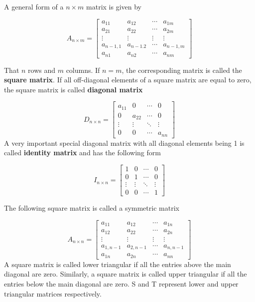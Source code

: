 \documentclass[
]{book}
\begin{document}
A general form of a \(n\times m\) matrix is given by

\[
A_{n\times m} = \left[\begin{array}{ccccc} 
a_{11} & a_{12} & \cdots & a_{1m}  \\ 
a_{21} & a_{22} & \cdots & a_{2m}  \\ 
\vdots & \vdots & \vdots & \vdots  \\
a_{n-1,1} & a_{n-1.2} & \cdots & a_{n-1,m}  \\
a_{n1} & a_{n2} & \cdots & a_{nm}  
\end{array}
\right]
\]

That \(n\) rows and \(m\) columns. If \(n = m\), the corresponding matrix is called the \textbf{square matrix}. If all off-diagonal elements of a square matrix are equal to zero, the square matrix is called \textbf{diagonal matrix}

\[
D_{n\times n} = \left[\begin{array}{ccccc} 
a_{11} & 0 & \cdots & 0  \\ 
0 & a_{22} & \cdots & 0  \\ 
\vdots & \vdots & \ddots & \vdots  \\
0 & 0& \cdots & a_{nn}  
\end{array}
\right]
\]
A very important special diagonal matrix with all diagonal elements being 1 is called \textbf{identity matrix} and has the following form

\[
I_{n\times n} = \left[\begin{array}{ccccc} 
1 & 0 & \cdots & 0  \\ 
0 & 1 & \cdots & 0  \\ 
\vdots & \vdots & \ddots & \vdots  \\
0 & 0& \cdots & 1  
\end{array}
\right]
\]

The following square matrix is called a symmetric matrix

\[
A_{n\times n} = \left[\begin{array}{ccccc} 
a_{11} & a_{12} & \cdots & a_{1n}  \\ 
a_{12} & a_{22} & \cdots & a_{2n}  \\ 
\vdots & \vdots & \vdots & \vdots  \\
a_{1,n-1} & a_{2,n-1} & \cdots & a_{n,n-1}  \\
a_{1n} & a_{2n} & \cdots & a_{nn}  
\end{array}
\right]
\]
A square matrix is called lower triangular if all the entries above the main diagonal are zero. Similarly, a square matrix is called upper triangular if all the entries below the main diagonal are zero. S and T represent lower and upper triangular matrices respectively.
\end{document}
